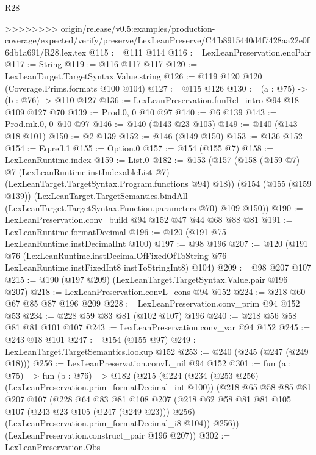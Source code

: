 \begin{lexlean}{R28}
\begin{coremodule}
{{{{{>>>>>>>> origin/release/v0.5:examples/production-coverage/expected/verify/preserve/LexLeanPreserve/C4fb8915440d4f7428aa22e0f6db1a691/R28.lex.tex
@115 := @111 @114
@116 := LexLeanPreservation.encPair
@117 := String
@119 := @116 @117 @117
@120 := LexLeanTarget.TargetSyntax.Value.string
@126 := @119 @120 @120 (Coverage.Prims.formats @100 @104)
@127 := @115 @126
@130 := (a : @75) -> (b : @76) -> @110 @127
@136 := LexLeanPreservation.funRel_intro @94 @18 @109 @127 @70
@139 := Prod.{0, 0} @10 @97
@140 := @6 @139
@143 := Prod.mk.{0, 0} @10 @97
@146 := @140 (@143 @23 @105)
@149 := @140 (@143 @18 @101)
@150 := @2 @139
@152 := @146 (@149 @150)
@153 := @136 @152
@154 := Eq.refl.{1}
@155 := Option.{0}
@157 := @154 (@155 @7)
@158 := LexLeanRuntime.index
@159 := List.{0}
@182 := @153
    (@157
      (@158
        (@159 @7)
        @7
        (LexLeanRuntime.instIndexableList @7)
        (LexLeanTarget.TargetSyntax.Program.functions @94)
        @18))
    (@154
      (@155 (@159 @139))
      (LexLeanTarget.TargetSemantics.bindAll
        (LexLeanTarget.TargetSyntax.Function.parameters @70)
        @109
        @150))
@190 := LexLeanPreservation.conv_build @94 @152 @47 @44 @68 @88 @81
@191 := LexLeanRuntime.formatDecimal
@196 := @120 (@191 @75 LexLeanRuntime.instDecimalInt @100)
@197 := @98 @196
@207 := @120
    (@191
      @76
      (LexLeanRuntime.instDecimalOfFixedOfToString
        @76
        LexLeanRuntime.instFixedInt8
        instToStringInt8)
      @104)
@209 := @98 @207 @107
@215 := @190 (@197 @209) (LexLeanTarget.TargetSyntax.Value.pair @196 @207)
@218 := LexLeanPreservation.convL_cons @94 @152
@224 := @218 @60 @67 @85 @87 @196 @209
@228 := LexLeanPreservation.conv_prim @94 @152 @53
@234 := @228 @59 @83 @81 (@102 @107) @196
@240 := @218 @56 @58 @81 @81 @101 @107
@243 := LexLeanPreservation.conv_var @94 @152
@245 := @243 @18 @101
@247 := @154 (@155 @97)
@249 := LexLeanTarget.TargetSemantics.lookup @152
@253 := @240 (@245 (@247 (@249 @18)))
@256 := LexLeanPreservation.convL_nil @94 @152
@301 := fun (a : @75) =>
  fun (b : @76) =>
  @182
    (@215
      (@224
        (@234 (@253 @256) (LexLeanPreservation.prim_formatDecimal_int @100))
        (@218
          @65
          @58
          @85
          @81
          @207
          @107
          (@228
            @64
            @83
            @81
            @108
            @207
            (@218 @62 @58 @81 @81 @105 @107 (@243 @23 @105 (@247 (@249 @23))) @256)
            (LexLeanPreservation.prim_formatDecimal_i8 @104))
          @256))
      (LexLeanPreservation.construct_pair @196 @207))
@302 := LexLeanPreservation.Obs
}}}}}
\end{coremodule}
\end{lexlean}
